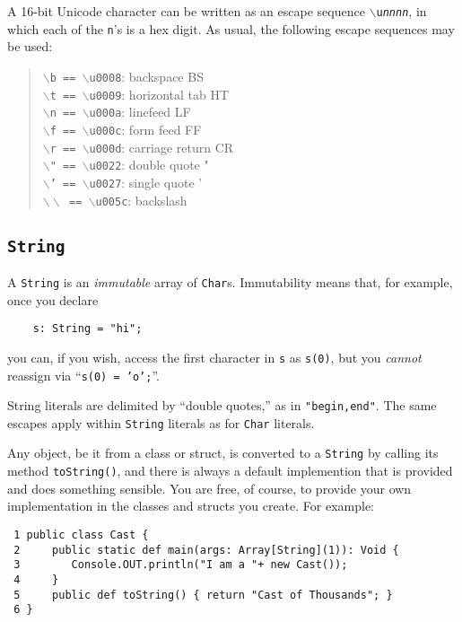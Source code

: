 A 16-bit Unicode character can be written as an escape sequence
$\backslash${\tt u{\em nnnn}}, in which each of the {\tt n}'s is a hex digit. 
As usual, the following escape sequences may be used:
\begin{quote}
 {\tt $\backslash$b == $\backslash$u0008}: backspace BS\\              
 {\tt $\backslash$t == $\backslash$u0009}: horizontal tab HT\\       
 {\tt $\backslash$n == $\backslash$u000a}: linefeed LF\\
 {\tt $\backslash$f == $\backslash$u000c}: form feed FF\\
 {\tt $\backslash$r == $\backslash$u000d}: carriage return CR\\
 {\tt $\backslash$" == $\backslash$u0022}: double quote "\\
 {\tt $\backslash$' == $\backslash$u0027}: single quote '\\
 {\tt $\backslash\backslash$ == $\backslash$u005c}: backslash           
\end{quote}
\subsection{\tt String}

A {\tt String} is an {\em immutable} array of {\tt Char}s.  Immutability means
that, for example, once you declare
\begin{verbatim}
    s: String = "hi";
\end{verbatim}
you can, if you wish, access the first character in {\tt s} as {\tt s(0)}, but
you {\em cannot} reassign via ``{\tt s(0) = 'o';}''.

String literals are delimited by ``double quotes,'' as in {\tt "begin,end"}. 
The same escapes apply within {\tt String} literals as for {\tt Char} literals.

Any object, be it from a class or struct, is converted to a {\tt String} by
calling its method {\tt toString()}, and there is always a default implemention
that is provided and does something sensible.  You are free, of course, to
provide your own implementation in the classes and structs you create.  For
example:
\begin{verbatim}
 1 public class Cast {
 2     public static def main(args: Array[String](1)): Void {
 3        Console.OUT.println("I am a "+ new Cast());
 4     }
 5     public def toString() { return "Cast of Thousands"; }
 6 }
\end{verbatim}

